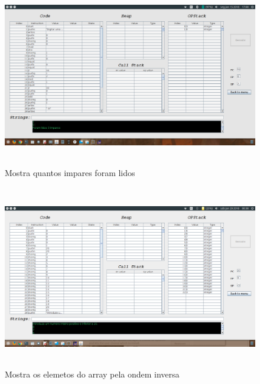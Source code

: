\documentclass{report}
\begin{document}
\begin{figure}[h]
	\centering
	\includegraphics[width=14cm,height= 8cm]{exemplo4-1.png}
	\caption{Mostra quantos impares foram lidos}
	\label{Exemplo 4.1}
\end{figure}
\begin{figure}[h]
	\centering
	\includegraphics[width=14cm,height= 8cm]{exemplo6-1.png}
	\caption{Mostra os elemetos do array pela ondem inversa}
	\label{Exemplo 6.1}
\end{figure}
\end{document}
